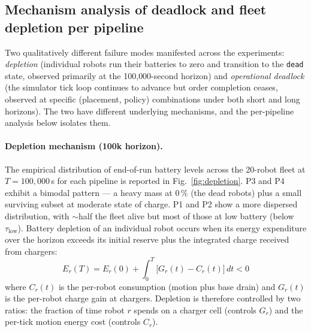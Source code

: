 \documentclass[conference]{IEEEtran}
\begin{document}
\subsection{Mechanism analysis of deadlock and fleet depletion per pipeline}
\label{sec:mech_deadlock_depletion}

Two qualitatively different failure modes manifested across the experiments: \emph{depletion} (individual robots run their batteries to zero and transition to the \texttt{dead} state, observed primarily at the 100{,}000-second horizon) and \emph{operational deadlock} (the simulator tick loop continues to advance but order completion ceases, observed at specific (placement, policy) combinations under both short and long horizons). The two have different underlying mechanisms, and the per-pipeline analysis below isolates them.

\paragraph{Depletion mechanism (100k horizon).}
The empirical distribution of end-of-run battery levels across the 20-robot fleet at $T = 100{,}000$\,s for each pipeline is reported in Fig.~\ref{fig:depletion}. P3 and P4 exhibit a bimodal pattern --- a heavy mass at $0\,\%$ (the dead robots) plus a small surviving subset at moderate state of charge. P1 and P2 show a more dispersed distribution, with $\sim$half the fleet alive but most of those at low battery (below $\tau_\text{low}$). Battery depletion of an individual robot occurs when its energy expenditure over the horizon exceeds its initial reserve plus the integrated charge received from chargers:
\begin{equation}
  E_r(T) = E_r(0) + \int_0^T \big[ G_r(t) - C_r(t) \big]\,dt < 0
\end{equation}
where $C_r(t)$ is the per-robot consumption (motion plus base drain) and $G_r(t)$ is the per-robot charge gain at chargers. Depletion is therefore controlled by two ratios: the fraction of time robot $r$ spends on a charger cell (controls $G_r$) and the per-tick motion energy cost (controls $C_r$).
\end{document}
